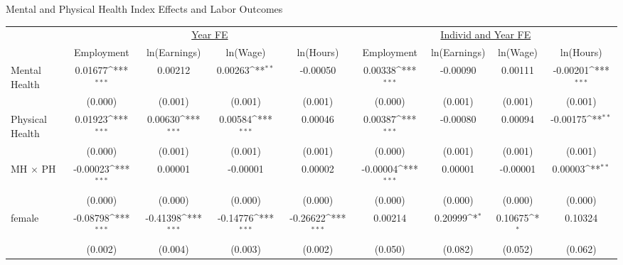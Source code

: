 \def\sym#1{\ifmmode^{#1}\else\(^{#1}\)\fi}
\center\caption{Mental and Physical Health Index Effects and Labor Outcomes}
\tiny\begin{tabular}{l*{8}{c}}
                    &\multicolumn{4}{c}{\underline{Year FE}}                                                &\multicolumn{4}{c}{\underline{Individ and Year FE}}                                    \\\cmidrule(lr){2-5}\cmidrule(lr){6-9}
                    &\multicolumn{1}{c}{Employment}&\multicolumn{1}{c}{ln(Earnings)}&\multicolumn{1}{c}{ln(Wage)}&\multicolumn{1}{c}{ln(Hours)}&\multicolumn{1}{c}{Employment}&\multicolumn{1}{c}{ln(Earnings)}&\multicolumn{1}{c}{ln(Wage)}&\multicolumn{1}{c}{ln(Hours)}\\
\hline
Mental Health       &     0.01677\sym{***}&     0.00212         &     0.00263\sym{**} &    -0.00050         &     0.00338\sym{***}&    -0.00090         &     0.00111         &    -0.00201\sym{***}\\
                    &     (0.000)         &     (0.001)         &     (0.001)         &     (0.001)         &     (0.000)         &     (0.001)         &     (0.001)         &     (0.001)         \\
Physical Health     &     0.01923\sym{***}&     0.00630\sym{***}&     0.00584\sym{***}&     0.00046         &     0.00387\sym{***}&    -0.00080         &     0.00094         &    -0.00175\sym{**} \\
                    &     (0.000)         &     (0.001)         &     (0.001)         &     (0.001)         &     (0.000)         &     (0.001)         &     (0.001)         &     (0.001)         \\
MH $\times$ PH      &    -0.00023\sym{***}&     0.00001         &    -0.00001         &     0.00002         &    -0.00004\sym{***}&     0.00001         &    -0.00001         &     0.00003\sym{**} \\
                    &     (0.000)         &     (0.000)         &     (0.000)         &     (0.000)         &     (0.000)         &     (0.000)         &     (0.000)         &     (0.000)         \\
female              &    -0.08798\sym{***}&    -0.41398\sym{***}&    -0.14776\sym{***}&    -0.26622\sym{***}&     0.00214         &     0.20999\sym{*}  &     0.10675\sym{*}  &     0.10324         \\
                    &     (0.002)         &     (0.004)         &     (0.003)         &     (0.002)         &     (0.050)         &     (0.082)         &     (0.052)         &     (0.062)         \\

\end{tabular}
